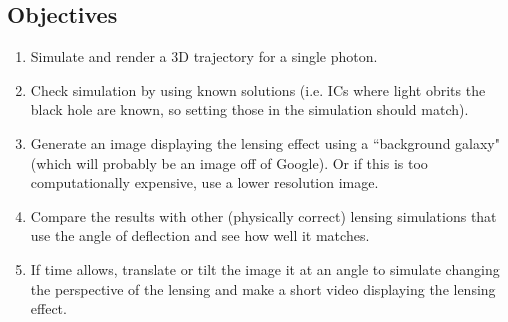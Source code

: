 \documentclass{article}
\begin{document}
\subsection*{Objectives}
\begin{enumerate}
	\item Simulate and render a 3D trajectory for a single photon.
	\item Check simulation by using known solutions (i.e. ICs where light obrits the black hole are known, so setting those in the simulation should match).
	\item Generate an image displaying the lensing effect using a ``background galaxy" (which will probably be an image off of Google). Or if this is too computationally expensive, use a lower resolution image. 
	\item Compare the results with other (physically correct) lensing simulations that use the angle of deflection and see how well it matches.
	\item If time allows, translate or tilt the image it at an angle to simulate changing the perspective of the lensing and make a short video displaying the lensing effect.
\end{enumerate}

	
	
	
	
\end{document}
